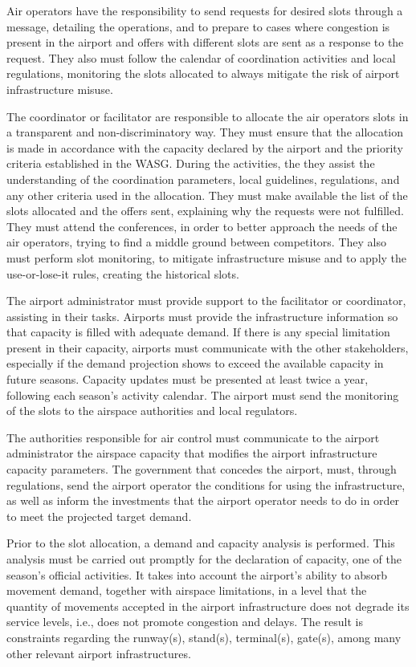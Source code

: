 Air operators have the responsibility to send requests for desired slots through a message, detailing the operations, and to prepare to cases where congestion is present in the airport and offers with different slots are sent as a response to the request. They also must follow the calendar of coordination activities and local regulations, monitoring the slots allocated to always mitigate the risk of airport infrastructure misuse.

The coordinator or facilitator are responsible to allocate the air operators slots in a transparent and non-discriminatory way. They must ensure that the allocation is made in accordance with the capacity declared by the airport and the priority criteria established in the WASG. During the activities, the they assist the understanding of the coordination parameters, local guidelines, regulations, and any other criteria used in the allocation. They must make available the list of the slots allocated and the offers sent, explaining why the requests were not fulfilled. They must attend the conferences, in order to better approach the needs of the air operators, trying to find a middle ground between competitors. They also must perform slot monitoring, to mitigate infrastructure misuse and to apply the use-or-lose-it rules, creating the historical slots.

The airport administrator must provide support to the facilitator or coordinator, assisting in their tasks. Airports must provide the infrastructure information so that capacity is filled with adequate demand. If there is any special limitation present in their capacity, airports must communicate with the other stakeholders, especially if the demand projection shows to exceed the available capacity in future seasons. Capacity updates must be presented at least twice a year, following each season's activity calendar. The airport must send the monitoring of the slots to the airspace authorities and local regulators.

The authorities responsible for air control must communicate to the airport administrator the airspace capacity that modifies the airport infrastructure capacity parameters. The government that concedes the airport, must, through regulations, send the airport operator the conditions for using the infrastructure, as well as inform the investments that the airport operator needs to do in order to meet the projected target demand.

Prior to the slot allocation, a demand and capacity analysis is performed. This analysis must be carried out promptly for the declaration of capacity, one of the season's official activities. It takes into account the airport's ability to absorb movement demand, together with airspace limitations, in a level that the quantity of movements accepted in the airport infrastructure does not degrade its service levels, i.e.,  does not promote congestion and delays. The result is constraints regarding the runway(s), stand(s), terminal(s), gate(s), among many other relevant airport infrastructures.

